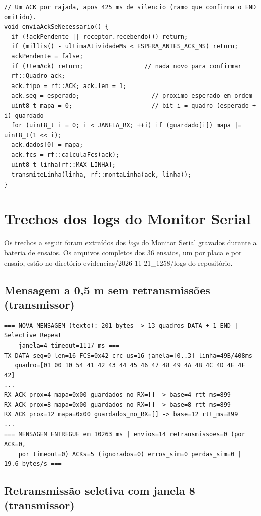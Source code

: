 \documentclass[12pt, oneside, a4paper, sumario=tradicional, chapter=TITLE, brazilian]{abntex2}
\begin{document}
\begin{apendicesenv}
\begin{Verbatim}[fontsize=\scriptsize,frame=single,framesep=2mm,rulecolor=\color{gray!60},breaklines,breakanywhere]
// Um ACK por rajada, apos 425 ms de silencio (ramo que confirma o END omitido).
void enviaAckSeNecessario() {
  if (!ackPendente || receptor.recebendo()) return;
  if (millis() - ultimaAtividadeMs < ESPERA_ANTES_ACK_MS) return;
  ackPendente = false;
  if (!temAck) return;                 // nada novo para confirmar
  rf::Quadro ack;
  ack.tipo = rf::ACK; ack.len = 1;
  ack.seq = esperado;                    // proximo esperado em ordem
  uint8_t mapa = 0;                      // bit i = quadro (esperado + i) guardado
  for (uint8_t i = 0; i < JANELA_RX; ++i) if (guardado[i]) mapa |= uint8_t(1 << i);
  ack.dados[0] = mapa;
  ack.fcs = rf::calculaFcs(ack);
  uint8_t linha[rf::MAX_LINHA];
  transmiteLinha(linha, rf::montaLinha(ack, linha));
}
\end{Verbatim}

\chapter{Trechos dos logs do Monitor Serial}
Os trechos a seguir foram extraídos dos \textit{logs} do Monitor Serial gravados durante a bateria de ensaios. Os arquivos completos dos 36 ensaios, um por placa e por ensaio, estão no diretório evidencias/2026-11-21\_1258/logs do repositório.

\section{Mensagem a 0,5 m sem retransmissões (transmissor)}

\begin{Verbatim}[fontsize=\scriptsize,frame=single,framesep=2mm,rulecolor=\color{gray!60},breaklines,breakanywhere]
=== NOVA MENSAGEM (texto): 201 bytes -> 13 quadros DATA + 1 END | Selective Repeat
    janela=4 timeout=1117 ms ===
TX DATA seq=0 len=16 FCS=0x42 crc_us=16 janela=[0..3] linha=49B/408ms
   quadro=[01 00 10 54 41 42 43 44 45 46 47 48 49 4A 4B 4C 4D 4E 4F 42]
...
RX ACK prox=4 mapa=0x00 guardados_no_RX=[] -> base=4 rtt_ms=899
RX ACK prox=8 mapa=0x00 guardados_no_RX=[] -> base=8 rtt_ms=899
RX ACK prox=12 mapa=0x00 guardados_no_RX=[] -> base=12 rtt_ms=899
...
=== MENSAGEM ENTREGUE em 10263 ms | envios=14 retransmissoes=0 (por ACK=0,
    por timeout=0) ACKs=5 (ignorados=0) erros_sim=0 perdas_sim=0 | 19.6 bytes/s ===
\end{Verbatim}

\section{Retransmissão seletiva com janela 8 (transmissor)}


\end{apendicesenv}
\end{document}
